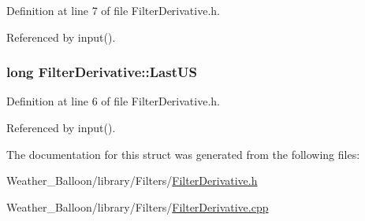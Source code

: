 Definition at line 7 of file Filter\+Derivative.\+h.



Referenced by input().

\subsubsection[{\texorpdfstring{Last\+US}{LastUS}}]{\setlength{\rightskip}{0pt plus 5cm}long Filter\+Derivative\+::\+Last\+US}\hypertarget{struct_filter_derivative_a6e64fea4ef8778deb71cf8df694c8bcf}{}\label{struct_filter_derivative_a6e64fea4ef8778deb71cf8df694c8bcf}


Definition at line 6 of file Filter\+Derivative.\+h.



Referenced by input().



The documentation for this struct was generated from the following files\+:\begin{DoxyCompactItemize}
\item 
Weather\+\_\+\+Balloon/library/\+Filters/\hyperlink{_filter_derivative_8h}{Filter\+Derivative.\+h}\item 
Weather\+\_\+\+Balloon/library/\+Filters/\hyperlink{_filter_derivative_8cpp}{Filter\+Derivative.\+cpp}\end{DoxyCompactItemize}
